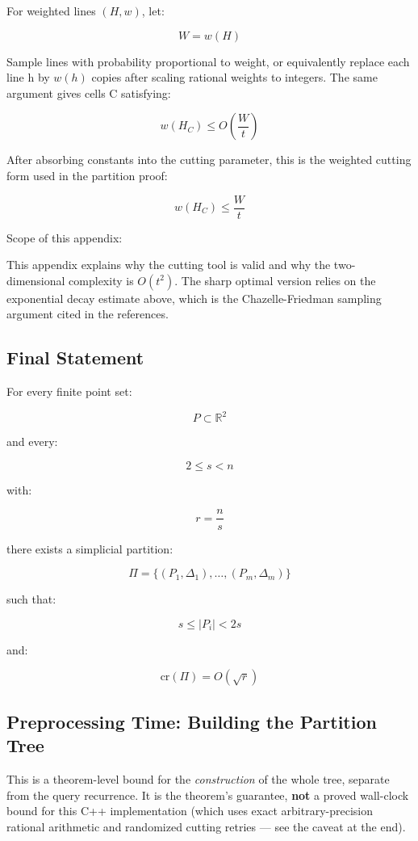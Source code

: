 \documentclass[
  11pt,
]{article}
\begin{document}
For weighted lines \((H,w)\), let:

\[
W=w(H)
\]

Sample lines with probability proportional to weight, or equivalently
replace each line h by \(w(h)\) copies after scaling rational weights to
integers. The same argument gives cells C satisfying:

\[
w(H_C)\le O\left(\frac Wt\right)
\]

After absorbing constants into the cutting parameter, this is the
weighted cutting form used in the partition proof:

\[
w(H_C)\le \frac Wt
\]

Scope of this appendix:

This appendix explains why the cutting tool is valid and why the
two-dimensional complexity is \(O(t^2)\). The sharp optimal version
relies on the exponential decay estimate above, which is the
Chazelle-Friedman sampling argument cited in the references.

\hypertarget{final-statement}{%
\subsection{Final Statement}\label{final-statement}}

For every finite point set:

\[
P\subset\mathbb R^2
\]

and every:

\[
2\le s< n
\]

with:

\[
r=\frac ns
\]

there exists a simplicial partition:

\[
\Pi=\lbrace (P_1,\Delta_1),\ldots,(P_m,\Delta_m) \rbrace
\]

such that:

\[
s\le |P_i|<2s
\]

and:

\[
\mathrm{cr}(\Pi)=O(\sqrt r)
\]

\hypertarget{preprocessing-time-building-the-partition-tree}{%
\subsection{Preprocessing Time: Building the Partition
Tree}\label{preprocessing-time-building-the-partition-tree}}

This is a theorem-level bound for the \emph{construction} of the whole
tree, separate from the query recurrence. It is the theorem's guarantee,
\textbf{not} a proved wall-clock bound for this C++ implementation
(which uses exact arbitrary-precision rational arithmetic and randomized cutting
retries --- see the caveat at the end).
\end{document}
